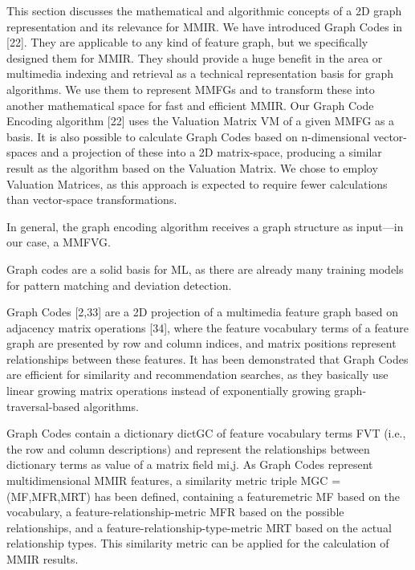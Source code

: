 This section discusses the mathematical and algorithmic concepts of a 2D graph
representation and its relevance for MMIR. We have introduced Graph Codes in [22]. They
are applicable to any kind of feature graph, but we specifically designed them for MMIR.
They should provide a huge benefit in the area or multimedia indexing and retrieval as a
technical representation basis for graph algorithms. We use them to represent MMFGs and
to transform these into another mathematical space for fast and efficient MMIR.
Our Graph Code Encoding algorithm [22] uses the Valuation Matrix VM of a given
MMFG as a basis. It is also possible to calculate Graph Codes based on n-dimensional
vector-spaces and a projection of these into a 2D matrix-space, producing a similar result
as the algorithm based on the Valuation Matrix. We chose to employ Valuation Matrices,
as this approach is expected to require fewer calculations than vector-space transformations.



In general, the graph encoding algorithm receives a graph structure as input—in our
case, a MMFVG.

Graph codes are a solid basis for ML, as there are already many training
models for pattern matching and deviation detection.

Graph Codes [2,33] are a 2D projection of a multimedia feature graph based on adjacency matrix operations [34], where the feature vocabulary terms of a feature graph are presented by row and column indices, and matrix positions represent relationships between these features. It has been demonstrated that Graph Codes are efficient for similarity and
recommendation searches, as they basically use linear growing matrix operations instead of exponentially growing graph-traversal-based algorithms.

Graph Codes contain a dictionary dictGC of feature vocabulary terms FVT (i.e., the row and column descriptions) and represent the relationships between dictionary terms as value of a matrix field mi,j. As Graph Codes represent multidimensional MMIR features, a similarity metric triple MGC = (MF,MFR,MRT) has been defined, containing a featuremetric MF based on the vocabulary, a feature-relationship-metric MFR based on the possible relationships, and a feature-relationship-type-metric MRT based on the actual relationship types. This similarity metric can be applied for the calculation of MMIR results.


